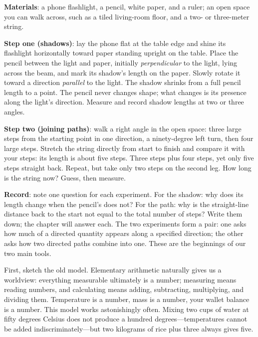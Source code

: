 \begin{experiment}
\textbf{Materials}: a phone flashlight, a pencil, white paper, and a ruler; an open space you can walk across, such as a tiled living-room floor, and a two- or three-meter string.

\textbf{Step one (shadows)}: lay the phone flat at the table edge and shine its flashlight horizontally toward paper standing upright on the table. Place the pencil between the light and paper, initially \emph{perpendicular} to the light, lying across the beam, and mark its shadow's length on the paper. Slowly rotate it toward a direction \emph{parallel} to the light. The shadow shrinks from a full pencil length to a point. The pencil never changes shape; what changes is its presence along the light's direction. Measure and record shadow lengths at two or three angles.

\textbf{Step two (joining paths)}: walk a right angle in the open space: three large steps from the starting point in one direction, a ninety-degree left turn, then four large steps. Stretch the string directly from start to finish and compare it with your steps: its length is about five steps. Three steps plus four steps, yet only five steps straight back. Repeat, but take only two steps on the second leg. How long is the string now? Guess, then measure.

\textbf{Record}: note one question for each experiment. For the shadow: why does its length change when the pencil's does not? For the path: why is the straight-line distance back to the start not equal to the total number of steps? Write them down; the chapter will answer each. The two experiments form a pair: one asks how much of a directed quantity appears along a specified direction; the other asks how two directed paths combine into one. These are the beginnings of our two main tools.
\end{experiment}


First, sketch the old model. Elementary arithmetic naturally gives us a worldview: everything measurable ultimately is a number; measuring means reading numbers, and calculating means adding, subtracting, multiplying, and dividing them. Temperature is a number, mass is a number, your wallet balance is a number. This model works astonishingly often. Mixing two cups of water at fifty degrees Celsius does not produce a hundred degrees---temperatures cannot be added indiscriminately---but two kilograms of rice plus three always gives five.

